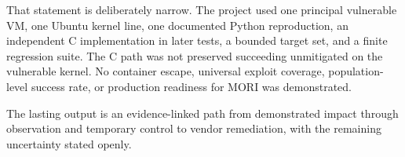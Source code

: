 That statement is deliberately narrow. The project used one principal vulnerable
VM, one Ubuntu kernel line, one documented Python reproduction, an independent C
implementation in later tests, a bounded target set, and a finite regression
suite. The C path was not preserved succeeding unmitigated on the vulnerable
kernel. No container escape, universal exploit coverage, population-level
success rate, or production readiness for MORI was demonstrated.

The lasting output is an evidence-linked path from demonstrated impact through
observation and temporary control to vendor remediation, with the remaining
uncertainty stated openly.